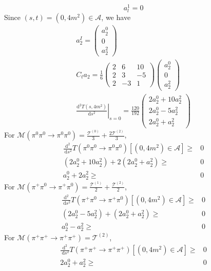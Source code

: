 ﻿\documentclass[12pt,a4paper]{article}
\begin{document}
$$a_{l}^{1}=0$$
Since $(s,t)=(0,4m^{2})\in \mathcal{A}$, we have
$$
\begin{array}{l}
a_{2}^{I}=\left(\begin{array}{c}
a_{2}^{0} \\ 
0 \\
a_{2}^{2}
\end{array}\right)\\
C_{t}a_{2}=\frac{1}{6}\left(\begin{array}{ccc}
2 & 6 & 10 \\
2 & 3 & -5 \\
2 & -3 & 1
\end{array}\right)\left(\begin{array}{c}
a_{2}^{0} \\
0 \\
a_{2}^{2}
\end{array}\right) \\
\left.\frac{\mathrm{d}^{2} T\left(s, 4 m^{2}\right)}{\mathrm{d} s^{2}}\right|_{s=0}=\frac{120}{192}\left(\begin{array}{c}
2 a_{2}^{0} + 10 a_{2}^{2}\\
2 a_{2}^{0} - 5 a_{2}^{2}\\
2 a_{2}^{0} + a_{2}^{2}
\end{array}\right)
\end{array}
$$
For $\mathcal{M}\left(\pi^{0} \pi^{0} \rightarrow \pi^{0} \pi^{0}\right)=\frac{\mathcal{T}^{(0)}}{3}+\frac{2 \mathcal{T}^{(2)}}{3}$,
$$
\begin{aligned}
\frac{\mathrm{d}^{2}}{\mathrm{~d} s^{2}} T\left(\pi^{0} \pi^{0} \rightarrow \pi^{0} \pi^{0}\right)[(0,4m^{2}) \in \mathcal{A}] \geq &0\\
(2 a_{2}^{0} + 10 a_{2}^{2})+2(2 a_{2}^{0} + a_{2}^{2}) \geq &0\\
a_{2}^{0} + 2 a_{2}^{2} \geq &0
\end{aligned}
$$
For $\mathcal{M}\left(\pi^{+} \pi^{0} \rightarrow \pi^{+} \pi^{0}\right)=\frac{\mathcal{T}^{(1)}}{2}+\frac{\mathcal{T}^{(2)}}{2}$,
$$
\begin{aligned}
\frac{\mathrm{d}^{2}}{\mathrm{~d} s^{2}} T\left(\pi^{+} \pi^{0} \rightarrow \pi^{+} \pi^{0}\right)[(0,4m^{2}) \in \mathcal{A}] \geq &0\\
(2 a_{2}^{0} - 5 a_{2}^{2})+(2 a_{2}^{0} + a_{2}^{2}) \geq &0\\
a_{2}^{0} - a_{2}^{2} \geq &0
\end{aligned}
$$
For $\mathcal{M}\left(\pi^{+} \pi^{+} \rightarrow \pi^{+} \pi^{+}\right)=\mathcal{T}^{(2)}$,
$$
\begin{aligned}
\frac{\mathrm{d}^{2}}{\mathrm{~d} s^{2}} T\left(\pi^{+} \pi^{+} \rightarrow \pi^{+} \pi^{+}\right)[(0,4m^{2}) \in \mathcal{A}] \geq &0\\
2 a_{2}^{0} + a_{2}^{2}\geq &0
\end{aligned}
$$
\end{document}
